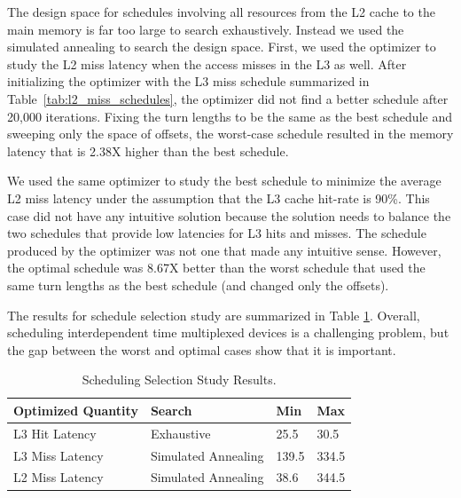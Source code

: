 The design space for schedules involving all resources from the L2 cache to
the main memory is far too large to search exhaustively.
Instead we used the simulated annealing to search the design space.
First, we used the optimizer to study the L2 miss latency when the access misses
in the L3 as well.
After initializing the optimizer with the L3 miss schedule summarized in 
Table~\ref{tab:l2_miss_schedules}, the optimizer did not find a better schedule 
after 20,000 iterations. Fixing the turn lengths to be the same as the best 
schedule and sweeping only the space of offsets,
the worst-case schedule resulted in the memory latency that is 2.38X
higher than the best schedule.

We used the same optimizer to study the best schedule to minimize the average
L2 miss latency under the assumption that the L3 cache hit-rate is 90\%.
This case did not have any intuitive solution because the solution needs to 
balance the two schedules that provide low latencies for L3 hits and misses.
The schedule 
produced by the optimizer was not one that made any intuitive sense.  However, 
the optimal schedule was 8.67X better than the worst schedule that used the 
same turn lengths as the best schedule (and changed only the offsets).

The results for schedule selection study are summarized in Table 
\ref{tab:coord_results}. Overall, scheduling interdependent time multiplexed 
devices is a challenging problem, but the gap between the worst and optimal 
cases show that it is important.

\begin{table}
    \caption{Scheduling Selection Study Results.}
    \begin{small}
    \centering
    \begin{tabular}{|l|l|l|l|}
        \hline
        \multicolumn{1}{|l|}{Optimized Quantity} & Search & Min & Max \\\hline
        \multicolumn{1}{|l|}{L3 Hit Latency} & Exhaustive & 25.5 & 30.5 
        \\\hline
        \multicolumn{1}{|l|}{L3 Miss Latency} & Simulated Annealing& 139.5 & 
        334.5 \\\hline
        \multicolumn{1}{|l|}{L2 Miss Latency} & Simulated Annealing& 38.6 & 
        344.5 \\\hline
    \end{tabular}
    \end{small}
    \label{tab:coord_results}
\end{table}

